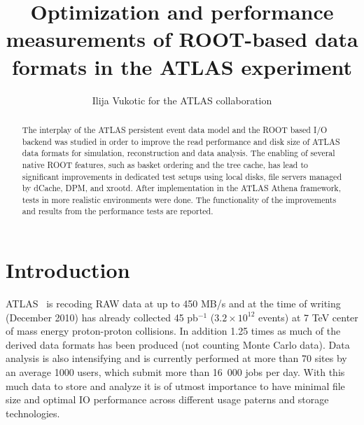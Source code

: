 \documentclass[a4paper]{jpconf}
\begin{document}
\title{Optimization and performance measurements of ROOT-based data formats in the ATLAS experiment}

\author{Ilija Vukotic for the ATLAS collaboration}

\address{Laboratoire de l'Acc\'{e}l\'{e}rateur Lin\'{e}aire, Universit\'{e} Paris-Sud 11, B\^{a}timent 200, 91898 Orsay, France}


\begin{abstract}
  The interplay of the ATLAS persistent event data model and the ROOT based I/O backend was studied in order to improve the read performance and disk size of ATLAS data formats for simulation, reconstruction and data analysis.  The enabling of several native ROOT features, such as basket ordering and the tree cache, has lead to significant improvements in dedicated test setups using local disks, file servers managed by dCache, DPM, and xrootd.  After implementation in the ATLAS Athena framework, tests in more realistic environments were done. The functionality of the improvements and results from the performance tests are reported.
\end{abstract}

\section{Introduction}

ATLAS~\cite{atlas} is recoding RAW data at up to 450 MB/s and at the time of writing (December 2010) has already collected 45 pb$^{-1}$ ($3.2\times10^{12}$ events) at 7 TeV center of mass energy proton-proton collisions. In addition 1.25 times as much of the derived data formats has been produced (not counting Monte Carlo data). Data analysis is also intensifying and is currently performed at more than 70 sites by an average 1000 users, which submit more than 16~000 jobs per day.
With this much data to store and analyze it is of utmost importance to have minimal file size and optimal IO performance across different usage paterns and storage technologies.
\end{document}
